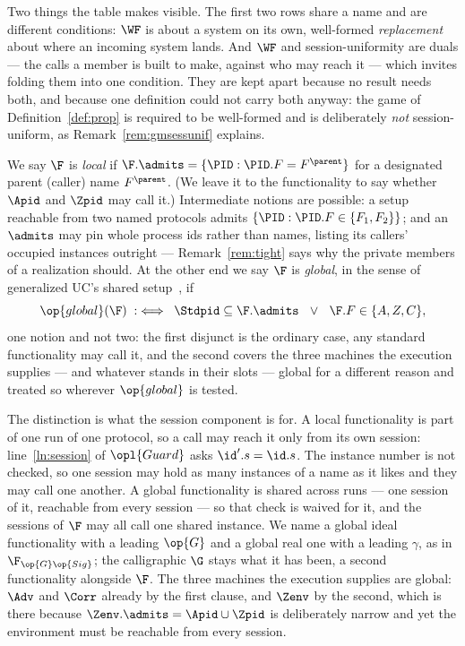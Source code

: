 \documentclass[10pt,oneside,openany]{book}
\theoremstyle{accentdef}
\theoremstyle{accentplain}
\begin{document}
Two things the table makes visible. The first two rows share a name and are different conditions:
$\WF$ is about a system on its own, well-formed \emph{replacement} about where an incoming system
lands. And $\WF$ and session-uniformity are duals --- the calls a member is built to make, against who
may reach it --- which invites folding them into one condition. They are kept apart because no result
needs both, and because one definition could not carry both anyway: the game of
Definition~\ref{def:prop} is required to be well-formed and is deliberately \emph{not}
session-uniform, as Remark~\ref{rem:gmsessunif} explains.

We say $\F$ is \emph{local} if $\F.\admits = \{\PID : \PID.F = F^{\parent}\}$ for a
designated parent (caller) name $F^{\parent}$. (We leave it to the functionality to say whether
$\Apid$ and $\Zpid$ may call it.) Intermediate notions are possible: a setup reachable from two
named protocols admits $\{\PID : \PID.F \in \{F_1,F_2\}\}$; and an $\admits$ may pin whole
process ids rather than names, listing its callers' occupied instances outright ---
Remark~\ref{rem:tight} says why the private members of a realization should. At the other end we
say $\F$ is
\emph{global}, in the sense of generalized UC's shared setup~\cite{CDPW07}, if
\[
  \op{global}(\F) \;:\iff\; \Stdpid \subseteq \F.\admits \ \ \vee\ \ \F.F \in \{A,Z,C\} ,
\]
one notion and not two: the first disjunct is the ordinary case, any standard functionality may
call it, and the second covers the three machines the execution supplies --- and whatever stands
in their slots --- global for a
different reason and treated so wherever $\op{global}$ is tested.

The distinction is what the session component is for. A local functionality is part of one run of
one protocol, so a call may reach it only from its own session: line~\ref{ln:session} of
$\opl{Guard}$ asks $\id'.s = \id.s$. The instance number is not checked, so one session may hold
as many instances of a name as it likes and they may call one another. A global functionality is
shared across runs --- one session of it, reachable from every session --- so that check is
waived for it, and the sessions of $\F$ may all call one shared instance. We name a global ideal
functionality with a leading $\op{G}$ and a global real one with a leading $\gamma$, as in
$\F_{\op{G}\op{Sig}}$; the calligraphic $\G$ stays what it has been, a second
functionality alongside $\F$. The three machines the execution supplies are
global: $\Adv$ and $\Corr$ already by the first clause, and $\Zenv$ by the second, which is there
because $\Zenv.\admits = \Apid \cup \Zpid$ is deliberately narrow and yet the environment must be
reachable from every session.
\end{document}
